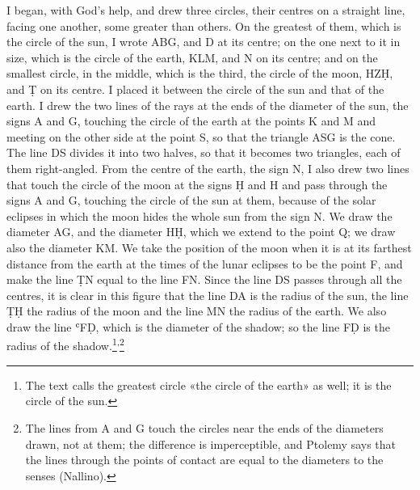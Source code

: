 \documentclass[11pt]{article}
\newcommand{\ArPage}[1]{\marginpar{\footnotesize\color{gray}Ar.\,p.\,#1}}
\begin{document}
\par \ArPage{89}I began, with God's help, and drew three circles, their centres on a straight line, facing one another, some greater than others. On the greatest of them, which is the circle of the sun, I wrote ABG, and D at its centre; on the one next to it in size, which is the circle of the earth, KLM, and N on its centre; and on the smallest circle, in the middle, which is the third, the circle of the moon, HZḤ, and Ṭ on its centre. I placed it between the circle of the sun and that of the earth. I drew the two lines of the rays at the ends of the diameter of the sun, the signs A and G, touching the circle of the earth at the points K and M and meeting on the other side at the point S, so that the triangle ASG is the cone. The line DS divides it into two halves, so that it becomes two triangles, each of them right-angled. From the centre of the earth, the sign N, I also drew two lines that touch the circle of the moon at the signs Ḥ and H and pass through the signs A and G, touching the circle of the sun at them, because of the solar eclipses in which the moon hides the whole sun from the sign N. We draw the diameter AG, and the diameter HḤ, which we extend to the point Q; we draw also the diameter KM. We take the position of the moon when it is at its farthest distance from the earth at the times of the lunar eclipses to be the point F, and make the line ṬN equal to the line FN. Since the line DS passes through all the centres, it is clear in this figure that the line DA is the radius of the sun, the line ṬḤ the radius of the moon and the line MN the radius of the earth. We also draw the line ʿFḌ, which is the diameter of the shadow; so the line FḌ is the radius of the shadow.\footnote{The text calls the greatest circle «the circle of the earth» as well; it is the circle of the sun.}\textsuperscript{,}\footnote{The lines from A and G touch the circles near the ends of the diameters drawn, not at them; the difference is imperceptible, and Ptolemy says that the lines through the points of contact are equal to the diameters to the senses (Nallino).}\par
\end{document}
